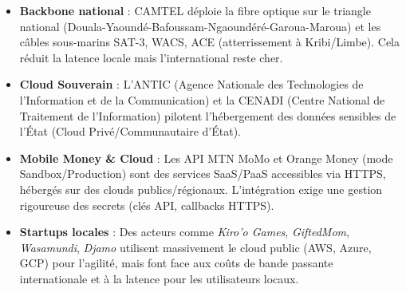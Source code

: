 \documentclass[11pt]{article}
\begin{document}
\begin{savaistu}
\begin{itemize}
\item \textbf{Backbone national} : CAMTEL déploie la fibre optique sur le triangle national (Douala-Yaoundé-Bafoussam-Ngaoundéré-Garoua-Maroua) et les câbles sous-marins SAT-3, WACS, ACE (atterrissement à Kribi/Limbe). Cela réduit la latence locale mais l'international reste cher.
\item \textbf{Cloud Souverain} : L'ANTIC (Agence Nationale des Technologies de l'Information et de la Communication) et la CENADI (Centre National de Traitement de l'Information) pilotent l'hébergement des données sensibles de l'État (Cloud Privé/Communautaire d'État).
\item \textbf{Mobile Money \& Cloud} : Les API MTN MoMo et Orange Money (mode Sandbox/Production) sont des services SaaS/PaaS accessibles via HTTPS, hébergés sur des clouds publics/régionaux. L'intégration exige une gestion rigoureuse des secrets (clés API, callbacks HTTPS).
\item \textbf{Startups locales} : Des acteurs comme \emph{Kiro'o Games}, \emph{GiftedMom}, \emph{Wasamundi}, \emph{Djamo} utilisent massivement le cloud public (AWS, Azure, GCP) pour l'agilité, mais font face aux coûts de bande passante internationale et à la latence pour les utilisateurs locaux.
\end{itemize}
\end{savaistu}
\end{document}
